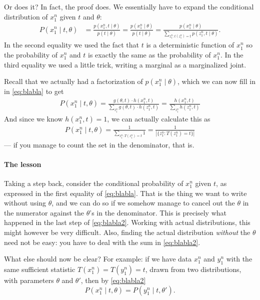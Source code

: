 \documentclass[a4paper,10pt,landscape,twocolumn]{scrartcl}
\begin{document}
	Or does it? In fact, the proof does. We essentially have to expand the conditional distribution of $x_1^n$ given $t$ and $\theta$:
	\begin{align}\label{eq:blabla}
	P(x_1^n \mid t, \theta) 
		&= 	\frac{p(x_1^n, t \mid \theta)}{p(t \mid \theta)}
		= \frac{p(x_1^n \mid \theta)}{p(t\mid \theta)}
		= \frac{p(x_1^n \mid \theta)}{\sum_{z_1^n: t(z_1^n) = t} p(z_1^n, t \mid \theta)}.
	\end{align}
	In the second equality we used the fact that $t$ is a deterministic function of $x_1^n$ so the probability of $x_1^n$ and $t$ is exactly the same as the probability of $x_1^n$. In the third equality we used a little trick, writing a marginal as a marginalized joint.
	
	Recall that we actually had a factorization of $p(x_1^n \mid \theta)$, which we can now fill in in \eqref{eq:blabla} to get 
	\begin{align}\label{eq:blabla2}
		P(x_1^n \mid t, \theta) 
			= \frac{g(\theta, t) \cdot h(x_1^n, t)}{\sum_{z_1^n} g(\theta, t) \cdot h(z_1^n, t)}
			= \frac{h(x_1^n,t)}{\sum_{z_1^n} h(z_1^n, t)}
	\end{align}
	And since we know $h(x_1^n, t) = 1$, we can actually calculate this as
	\begin{align}\label{eq:blabla3}
		P(x_1^n \mid t, \theta) 
			= \frac{1}{\sum_{z_1^n: T(z_1^n) = t} 1}
			= \frac{1}{|\{z_1^n: T(z_1^n) = t\}|}
	\end{align}
	--- if you manage to count the set in the denominator, that is.

	\paragraph{The lesson}
	Taking a step back, consider the conditional probability of $x_1^n$ given $t$, as expressed in the first equality of \eqref{eq:blabla}. That is the thing we want to write without using $\theta$, and we can do so if we somehow manage to cancel out the $\theta$ in the numerator against the $\theta$'s in the denominator. This is precisely what happened in the last step of \eqref{eq:blabla2}. Working with actual distributions, this might however be very difficult. Also, finding the actual distribution \emph{without} the $\theta$ need not be easy: you have to deal with the sum in \eqref{eq:blabla2}.
	
	What else should now be clear? For example: if we have data $x_1^n$ and $y_1^n$ with the same sufficient statistic $T(x_1^n) = T(y_1^n) = t$, drawn from two distributions, with parameters $\theta$ and $\theta'$, then by \eqref{eq:blabla2}
	\[
	P(x_1^n \mid t, \theta) = P(y_1^n \mid t, \theta').
	\]	 
	
\end{document}
